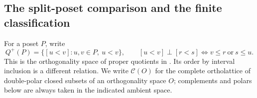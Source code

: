 
\subsection{The split-poset comparison and the finite classification}
\label{sec:split-poset-comparison}

For a poset $P$, write
\[
 Q^+(P)=\{[u<v]:u,v\in P,\ u<v\},
 \qquad [u<v]\perp[r<s]\iff v\le r\ \text{or}\ s\le u.
\]
This is the orthogonality space of proper quotients in
\citet[\S4, p.~6]{Jenca2022}. Its order by interval inclusion is a
different relation. We write $\mathcal C(O)$ for the complete
ortholattice of double-polar closed subsets of an orthogonality space
$O$; complements and polars below are always taken in the indicated
ambient space.

